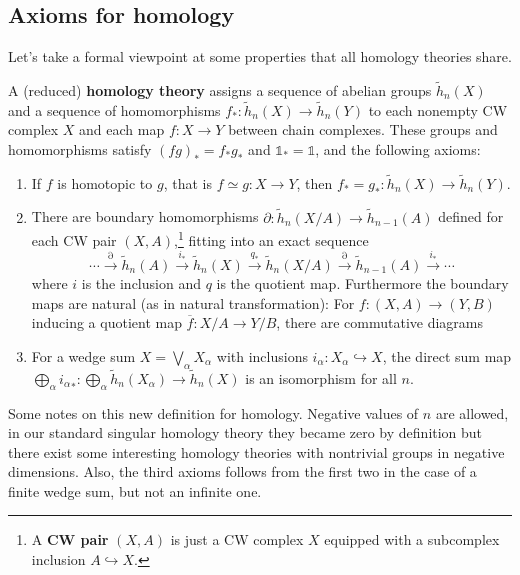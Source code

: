 \subsection{Axioms for homology}
Let's take a formal viewpoint at some properties that all homology theories share. 
\begin{definition}
A (reduced) \textbf{homology theory} assigns a sequence of abelian groups $\widetilde h_n (X)$ and a sequence of homomorphisms $f_* \colon \widetilde h_n (X) \to \widetilde h_n (Y)$ to each nonempty CW complex $X$ and each map $f \colon X \to Y$ between chain complexes. These groups and homomorphisms satisfy $(fg)_*=f_*g_*$ and $\mathbb{1}_*=\mathbb{1}$, and the following axioms:
\begin{enumerate}[label=(\arabic*)]
    \item If $f$ is homotopic to $g$, that is $f \simeq g \colon X \to Y$, then $f_*=g_* \colon \widetilde h_n (X) \to \widetilde h_n (Y)$.
    \item There are boundary homomorphisms $\partial  \colon \widetilde h_n (X /A) \to \widetilde h_{n-1}(A)$ defined for each CW pair $(X,A)$,\footnote{A \textbf{CW pair} $(X,A)$ is just a CW complex $X$ equipped with a subcomplex inclusion $A\hookrightarrow X$.} fitting into an exact sequence \[
            \cdots \overset{\partial }{\longrightarrow} \widetilde h_n (A) \overset{i_*}{\longrightarrow} \widetilde h_n (X) \overset{q_*}{\longrightarrow} \widetilde h_n (X /A) \overset{\partial }{\longrightarrow} \widetilde h_{n-1}(A)\overset{i_*}{\longrightarrow} \cdots 
        \] where $i$ is the inclusion and $q$ is the quotient map. Furthermore the boundary maps are natural (as in natural transformation): For $f\colon (X,A) \to (Y,B)$ inducing a quotient map $\overline{f}\colon X /A \to Y /B$, there are commutative diagrams 
        \begin{figure}[H]
        \centering
        \end{figure}
    \item For a wedge sum $X=\bigvee _{\alpha }X_{\alpha }$ with inclusions $i_{\alpha }\colon X_{\alpha } \hookrightarrow X$, the direct sum map $\bigoplus_{\alpha }{i_{\alpha }}_* \colon \bigoplus_{\alpha }\widetilde h_n (X_{\alpha }) \to \widetilde h_n (X)$ is an isomorphism for all $n$.
\end{enumerate}
\end{definition}
Some notes on this new definition for homology. Negative values of $n$ are allowed, in our standard singular homology theory they became zero by definition but there exist some interesting homology theories with nontrivial groups in negative dimensions. Also, the third axioms follows from the first two in the case of a finite wedge sum, but not an infinite one.

